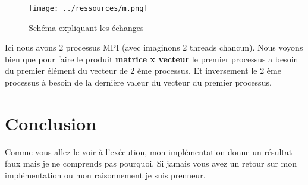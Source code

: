 \documentclass[11pt]{article}
\begin{document}
\begin{figure}[htbp]
\centering
\texttt{[image: ../ressources/m.png]}
\caption{\label{fig:org89da44d}Schéma expliquant les échanges}
\end{figure}

Ici nous avons 2 processus MPI (avec imaginons 2 threads chancun). Nous voyons
bien que pour faire le produit \textbf{matrice x vecteur} le premier processus a
besoin du premier élément du vecteur de 2 ème processus. Et inversement le 2
ème processus à besoin de la dernière valeur du vecteur du premier processus.

\section{Conclusion}
\label{sec:org44e0783}

Comme vous allez le voir à l'exécution, mon implémentation donne un résultat
faux mais je ne comprends pas pourquoi. Si jamais vous avez un retour sur mon
implémentation ou mon raisonnement je suis prenneur.
\end{document}
